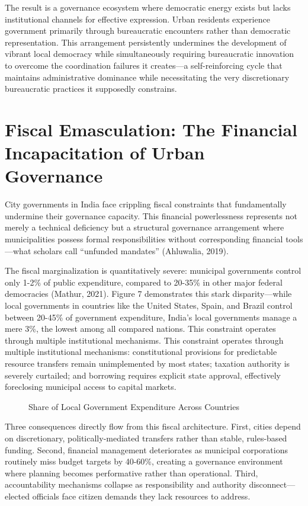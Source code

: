 The result is a governance ecosystem where democratic energy exists but lacks institutional channels for effective expression. Urban residents experience government primarily through bureaucratic encounters rather than democratic representation. This arrangement persistently undermines the development of vibrant local democracy while simultaneously requiring bureaucratic innovation to overcome the coordination failures it creates—a self-reinforcing cycle that maintains administrative dominance while necessitating the very discretionary bureaucratic practices it supposedly constrains.

\section{Fiscal Emasculation: The Financial Incapacitation of Urban Governance}

City governments in India face crippling fiscal constraints that fundamentally undermine their governance capacity. This financial powerlessness represents not merely a technical deficiency but a structural governance arrangement where municipalities possess formal responsibilities without corresponding financial tools—what scholars call ``unfunded mandates'' (Ahluwalia, 2019).

The fiscal marginalization is quantitatively severe: municipal governments control only 1-2\% of public expenditure, compared to 20-35\% in other major federal democracies (Mathur, 2021). Figure 7 demonstrates this stark disparity—while local governments in countries like the United States, Spain, and Brazil control between 20-45\% of government expenditure, India's local governments manage a mere 3\%, the lowest among all compared nations. This constraint operates through multiple institutional mechanisms. This constraint operates through multiple institutional mechanisms: constitutional provisions for predictable resource transfers remain unimplemented by most states; taxation authority is severely curtailed; and borrowing requires explicit state approval, effectively foreclosing municipal access to capital markets.

\begin{figure}[htbp]
\centering
\caption{Share of Local Government Expenditure Across Countries}
\label{fig:fiscal_constraint}
\end{figure}

Three consequences directly flow from this fiscal architecture. First, cities depend on discretionary, politically-mediated transfers rather than stable, rules-based funding. Second, financial management deteriorates as municipal corporations routinely miss budget targets by 40-60\%, creating a governance environment where planning becomes performative rather than operational. Third, accountability mechanisms collapse as responsibility and authority disconnect—elected officials face citizen demands they lack resources to address.

